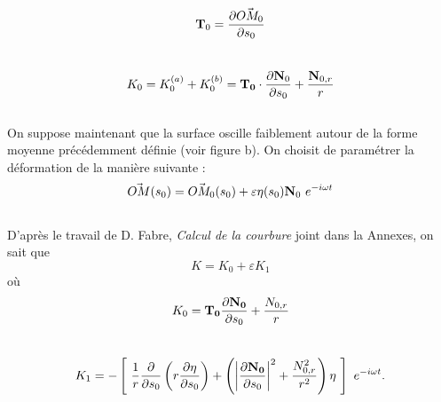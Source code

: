 \documentclass[a4paper]{report}
\begin{document}
$$
{\bf T}_0 = \frac{\partial \vec{OM_0}}{\partial s_0}
$$
\\[0.25cm]
\begin{equation*}
K_0 = K_0^{(a)} + K_0^{(b)} = {\bf T_0} \cdot \frac{\partial {\bf N}_0}{\partial s_0} + \frac{{\bf N}_{0,r}}{r}
\end{equation*}
\\[0.25cm]
On suppose maintenant que la surface oscille faiblement autour de la forme moyenne précédemment définie (voir figure b).
\newpage
On choisit de paramétrer la déformation de la manière suivante :
\\[0.25cm]
$$
\vec{OM}(s_0)  = \vec{OM_0}(s_0) + \varepsilon \eta(s_0) {\bf N}_0\ e^{- i \omega t}
$$
\\[0.25cm]
D'après le travail de D. Fabre,  \emph{Calcul de la courbure} joint dans la Annexes, on sait que
\\[0.25cm]
$$
K = K_0 + \varepsilon K_1
$$
où
\\[0.25cm]
$$
K_0   = {\bf T_0} \frac{\partial \bf N_0}{\partial s_0}  + \frac{N_{0,r}}{r}
$$
\\[0.25cm]
$$
K_1   =
- \left[\
\frac{1}{r} \frac{\partial }{\partial s_0} \left( r \frac{\partial \eta}{\partial s_0} \right)
+
\left( \left| \frac{\partial \bf N_0}{\partial s_0} \right|^2  + \frac{N_{0,r}^2}{r^2} \right) \eta
\ \right]\ e^{- i \omega t}.
$$
\end{document}
